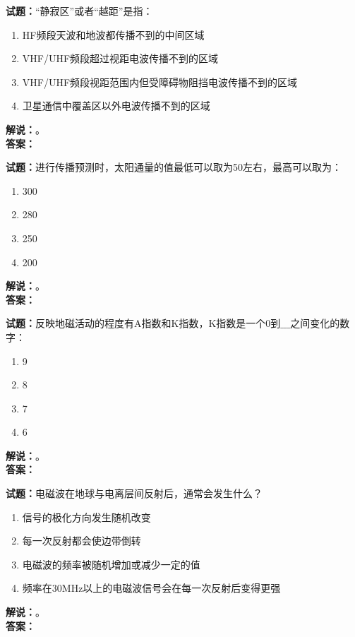 \documentclass{ctexbook}
\begin{document}
\bigskip




\noindent\textbf{试题：}“静寂区”或者“越距”是指：
\begin{enumerate}[leftmargin=3em]
\item HF频段天波和地波都传播不到的中间区域
\item VHF/UHF频段超过视距电波传播不到的区域
\item VHF/UHF频段视距范围内但受障碍物阻挡电波传播不到的区域
\item 卫星通信中覆盖区以外电波传播不到的区域
\end{enumerate}
\noindent\textbf{解说：}\textbf{}。\\\noindent\textbf{答案：}

\bigskip




\noindent\textbf{试题：}进行传播预测时，太阳通量的值最低可以取为50左右，最高可以取为：
\begin{enumerate}[leftmargin=3em]
\item 300
\item 280
\item 250
\item 200
\end{enumerate}
\noindent\textbf{解说：}\textbf{}。\\\noindent\textbf{答案：}

\bigskip



\noindent\textbf{试题：}反映地磁活动的程度有A指数和K指数，K指数是一个0到$\_\_\_$之间变化的数字：
\begin{enumerate}[leftmargin=3em]
\item 9
\item 8
\item 7
\item 6
\end{enumerate}
\noindent\textbf{解说：}\textbf{}。\\\noindent\textbf{答案：}

\bigskip




\noindent\textbf{试题：}电磁波在地球与电离层间反射后，通常会发生什么？
\begin{enumerate}[leftmargin=3em]
\item 信号的极化方向发生随机改变
\item 每一次反射都会使边带倒转
\item 电磁波的频率被随机增加或减少一定的值
\item 频率在30\unit{\MHz}以上的电磁波信号会在每一次反射后变得更强
\end{enumerate}
\noindent\textbf{解说：}\textbf{}。\\\noindent\textbf{答案：}
\end{document}
